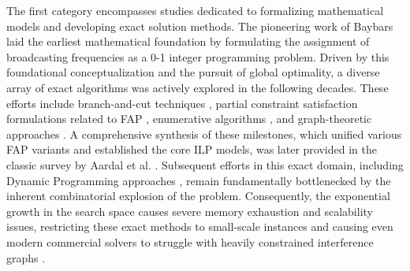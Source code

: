 \documentclass[letterpaper,journal]{IEEEtran}
\begin{document}
The first category encompasses studies dedicated to formalizing mathematical models and developing exact solution methods. The pioneering work of Baybars \cite{Baybars1982} laid the earliest mathematical foundation by formulating the assignment of broadcasting frequencies as a 0-1 integer programming problem. Driven by this foundational conceptualization and the pursuit of global optimality, a diverse array of exact algorithms was actively explored in the following decades. These efforts include branch-and-cut techniques \cite{Aardal1996, Fischetti2000}, partial constraint satisfaction formulations related to FAP \cite{Koster1998}, enumerative algorithms \cite{Mannino2003}, and graph-theoretic approaches \cite{Kral2005}. A comprehensive synthesis of these milestones, which unified various FAP variants and established the core ILP models, was later provided in the classic survey by Aardal et al. \cite{Aardal2007}. 
Subsequent efforts in this exact domain, including Dynamic Programming approaches \cite{Uyanik2014}, remain fundamentally bottlenecked by the inherent combinatorial explosion of the problem. 
Consequently, the exponential growth in the search space causes severe memory exhaustion and scalability issues, restricting these exact methods to small-scale instances and causing even modern commercial solvers to struggle with heavily constrained interference graphs \cite{Aardal2007, Uyanik2014}.
\end{document}
